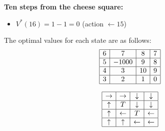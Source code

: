 \documentclass{article}
\begin{document}
\begin{enumerate}[label=(\alph*)]
    \textbf{Ten steps from the cheese square:}
    \begin{itemize}
        \item \( V^*(16) = 1 - 1 = 0 \) (action $\leftarrow 15$)
    \end{itemize}


    The optimal values for each state are as follows:
    \[
    \begin{array}{|c|c|c|c|}
    \hline
    6 & 7 & 8 & 7 \\ \hline
    5 & -1000 & 9 & 8 \\ \hline
    4 & 3 & 10 & 9 \\ \hline
    3 & 2 & 1 & 0 \\ \hline
    \end{array}
    \]

    \[
    \begin{array}{|c|c|c|c|}
    \hline
    \rightarrow & \rightarrow & \downarrow & \downarrow \\ \hline
    \uparrow & T & \downarrow & \downarrow \\ \hline
    \uparrow & \leftarrow & T & \leftarrow \\ \hline
    \uparrow & \uparrow & \leftarrow & \leftarrow \\ \hline
    \end{array}
    \]





\end{enumerate}
\end{document}
